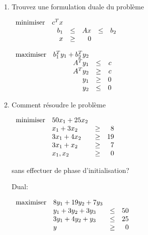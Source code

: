 \begin{enumerate}
\begin{solution}

    \end{solution}

  \item Trouvez une formulation duale du  problème

    $
    \begin{array}{lrcrcrcr}
      \mbox{minimiser} & c^T x\\
      & b_1 & \leq & A x & \leq &  b_2\\
      & x   & \geq & 0
    \end{array}
    $

    \begin{solution}
      $
      \begin{array}{lrcrcrcr}
        \mbox{maximiser} & b_{1}^{T}y_{1} + b_{2}^{T}y_{2}\\
        & A^{T}y_{1} & \leq & c\\
        & A^{T}y_{2} & \geq & c\\
        & y_1 & \geq & 0\\
        & y_2 & \leq & 0
      \end{array}
      $
    \end{solution}


  \item Comment résoudre le problème

    $
    \begin{array}{llcr}
      \mbox{minimiser} & 50x_1+25x_2\\
      & x_1+3x_2 & \geq & 8\\
      & 3x_1+4x_2 & \geq & 19\\
      & 3x_1+x_2 & \geq & 7\\
      & x_1, x_2 & \geq & 0
    \end{array}
    $

    sans effectuer de phase d'initialisation?


    \begin{solution}
      Dual:

      $
      \begin{array}{llcr}
        \mbox{maximiser} & 8y_{1} + 19y_{2} + 7y_{3}\\
        & y_1 + 3y_2 + 3y_3 & \leq & 50\\
        & 3y_1 + 4y_2 + y_3 & \leq & 25\\
        & y & \geq & 0
      \end{array}
      $


\end{solution}
\end{enumerate}
